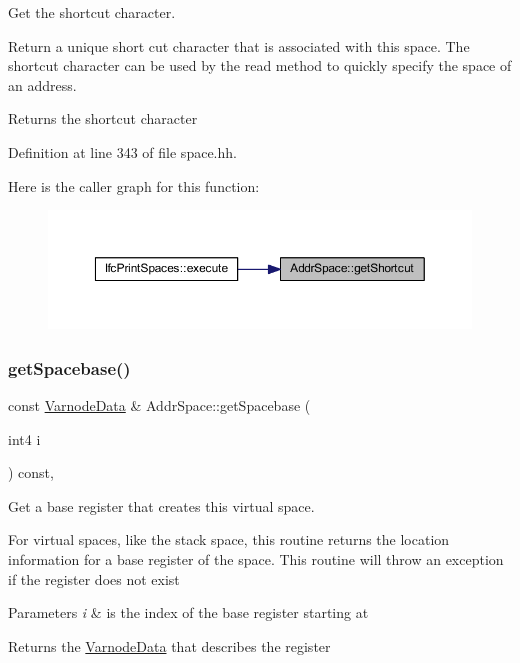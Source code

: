 Get the shortcut character. 

Return a unique short cut character that is associated with this space. The shortcut character can be used by the read method to quickly specify the space of an address. \begin{DoxyReturn}{Returns}
the shortcut character 
\end{DoxyReturn}


Definition at line 343 of file space.\+hh.

Here is the caller graph for this function\+:
\nopagebreak
\begin{figure}[H]
\begin{center}
\leavevmode
\includegraphics[width=350pt]{class_addr_space_aca9d79017012183ca27a1c921444c11c_icgraph}
\end{center}
\end{figure}
\mbox{\label{class_addr_space_ad6b5eb815514577118d9b998447cc4d0}} 
\subsubsection{\texorpdfstring{getSpacebase()}{getSpacebase()}}
{\footnotesize\ttfamily const \mbox{\hyperlink{struct_varnode_data}{Varnode\+Data}} \& Addr\+Space\+::get\+Spacebase (\begin{DoxyParamCaption}\item[{int4}]{i }\end{DoxyParamCaption}) const\hspace{0.3cm}{\ttfamily [inline]}, {\ttfamily [virtual]}}



Get a base register that creates this virtual space. 

For virtual spaces, like the stack space, this routine returns the location information for a base register of the space. This routine will throw an exception if the register does not exist 
\begin{DoxyParams}{Parameters}
{\em i} & is the index of the base register starting at \\
\hline
\end{DoxyParams}
\begin{DoxyReturn}{Returns}
the \mbox{\hyperlink{struct_varnode_data}{Varnode\+Data}} that describes the register 
\end{DoxyReturn}


